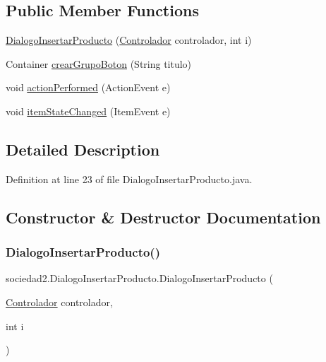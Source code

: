 \subsection*{Public Member Functions}
\begin{DoxyCompactItemize}
\item 
\mbox{\hyperlink{classsociedad2_1_1_dialogo_insertar_producto_a515496f2391bbc8216171f48da3a45c6}{Dialogo\+Insertar\+Producto}} (\mbox{\hyperlink{classsociedad2_1_1_controlador}{Controlador}} controlador, int i)
\item 
Container \mbox{\hyperlink{classsociedad2_1_1_dialogo_insertar_producto_aee7461340b7391e53ca39a6d72fb9ded}{crear\+Grupo\+Boton}} (String titulo)
\item 
void \mbox{\hyperlink{classsociedad2_1_1_dialogo_insertar_producto_a96b7d9145151ddc6ce20fe20acaa79e9}{action\+Performed}} (Action\+Event e)
\item 
void \mbox{\hyperlink{classsociedad2_1_1_dialogo_insertar_producto_a961e22b3de549ec4609e9a2c41670b98}{item\+State\+Changed}} (Item\+Event e)
\end{DoxyCompactItemize}


\subsection{Detailed Description}


Definition at line 23 of file Dialogo\+Insertar\+Producto.\+java.



\subsection{Constructor \& Destructor Documentation}
\mbox{\label{classsociedad2_1_1_dialogo_insertar_producto_a515496f2391bbc8216171f48da3a45c6}} 
\subsubsection{\texorpdfstring{Dialogo\+Insertar\+Producto()}{DialogoInsertarProducto()}}
{\footnotesize\ttfamily sociedad2.\+Dialogo\+Insertar\+Producto.\+Dialogo\+Insertar\+Producto (\begin{DoxyParamCaption}\item[{\mbox{\hyperlink{classsociedad2_1_1_controlador}{Controlador}}}]{controlador,  }\item[{int}]{i }\end{DoxyParamCaption})}



